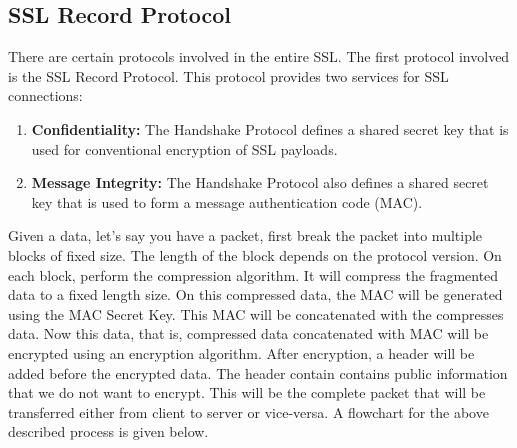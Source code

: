\documentclass[11pt]{article}
\begin{document}
\subsection{SSL Record Protocol}
There are certain protocols involved in the entire SSL. The first protocol involved is the SSL Record Protocol. This protocol provides two services for SSL connections:
\begin{enumerate}
    \item \textbf{Confidentiality:} The Handshake Protocol defines a shared secret key that is used for conventional encryption of SSL payloads.
    \item \textbf{Message Integrity:} The Handshake Protocol also defines a shared secret key that is used to form a message authentication code (MAC).
\end{enumerate}
Given a data, let's say you have a packet, first break the packet into multiple blocks of fixed size. The length of the block depends on the protocol version. On each block, perform the compression algorithm. It will compress the fragmented data to a fixed length size. On this compressed data, the MAC will be generated using the MAC Secret Key. This MAC will be concatenated with the compresses data. Now this data, that is, compressed data concatenated with MAC will be encrypted using an encryption algorithm. After encryption, a header will be added before the encrypted data. The header contain contains public information that we do not want to encrypt. This will be the complete packet that will be transferred either from client to server or vice-versa. A flowchart for the above described process is given below.
\end{document}
